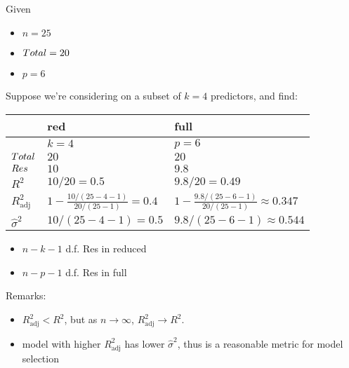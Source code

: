 \begin{Example}{}{}
      Given
      \begin{itemize}
            \item $ n=25 $
            \item $ \relax{Total}=20 $
            \item $ p=6 $
      \end{itemize}
      Suppose
      we're considering on a subset of $ k=4 $
      predictors, and find:

      \begin{center}
            \begin{tabularx}{0.8\linewidth}{@{}YYY@{}}
                                       & red                                     & full                                              \\
                  \midrule
                                       & $ k=4 $                                 & $ p=6 $                                           \\
                  $ \relax{Total} $       & $ 20 $                                  & $ 20 $                                            \\
                  $ \relax{Res} $         & $ 10 $                                  & $ 9.8 $                                           \\
                  \midrule
                  $ R^2 $              & $ 10/20=0.5 $                           & $ 9.8/20=0.49 $                                   \\
                  $ R^2_{\text{adj}} $ & $ 1-\frac{10/(25-4-1)}{20/(25-1)}=0.4 $ & $ 1-\frac{9.8/(25-6-1)}{20/(25-1)}\approx 0.347 $ \\
                  $ \hat{\sigma}^2 $   & $ 10/(25-4-1)=0.5 $                     & $ 9.8/(25-6-1)\approx 0.544 $
            \end{tabularx}
      \end{center}
      \begin{itemize}
            \item $ n-k-1 $ d.f. Res in reduced
            \item $ n-p-1 $ d.f. Res in full
      \end{itemize}
      Remarks:
      \begin{itemize}
            \item $ R^2_{\text{adj}}<R^2 $, but as $ n\to\infty $,
                  $ R^2_{\text{adj}}\to R^2 $.
            \item model with higher $ R^2_{\text{adj}} $
                  has lower $ \hat{\sigma}^2 $,
                  thus is a reasonable metric for model selection
      \end{itemize}
\end{Example}

